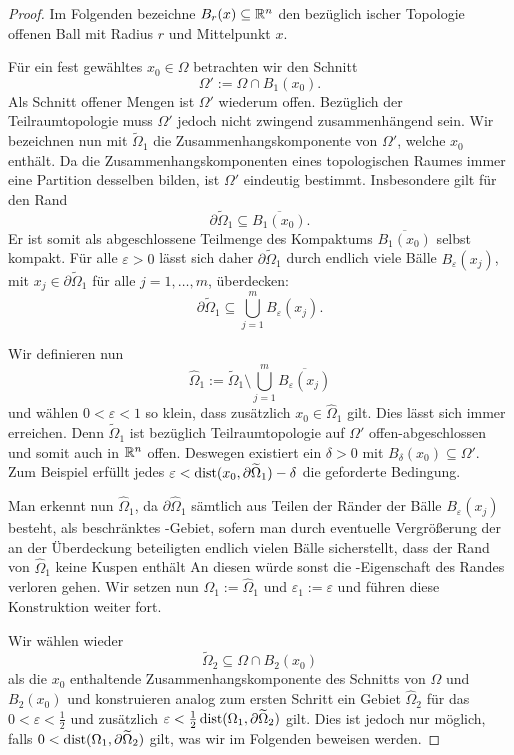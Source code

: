 \begin{proof}
Im Folgenden bezeichne $B_r(x) \subseteq \mathbb{R}^n$ den bezüglich \euklid ischer Topologie offenen Ball mit Radius $r$ und Mittelpunkt $x$.

  Für ein fest gewähltes $x_0 \in \Omega$ betrachten wir den Schnitt 
  $$
  \Omega' := \Omega \cap B_1(x_0).
  $$ 
  Als Schnitt offener Mengen ist $\Omega'$ wiederum offen. 
  Bezüglich der Teilraumtopologie muss $\Omega'$ jedoch nicht zwingend zusammenhängend sein.
  Wir bezeichnen nun mit $\widetilde\Omega_1$ die Zusammenhangskomponente von $\Omega'$, welche $x_0$ enthält.
  Da die Zusammenhangskomponenten eines topologischen Raumes immer eine Partition desselben bilden, ist $\Omega'$ eindeutig bestimmt.
  Insbesondere gilt für den Rand
  $$ 
  \partial \widetilde\Omega_1 \subseteq \overline{B_1(x_0)}.
  $$
  Er ist somit als abgeschlossene Teilmenge des Kompaktums $\overline{B_1(x_0)}$ selbst kompakt.
  Für alle $\varepsilon > 0$ lässt sich daher $\partial \widetilde\Omega_1$ durch endlich viele Bälle $B_\varepsilon(x_j)$, mit $x_j \in \partial \widetilde\Omega_1$ für alle $j = 1,\dots,m$, überdecken:
  $$ 
  \partial \widetilde\Omega_1 \subseteq \bigcup_{j = 1}^m B_\varepsilon(x_j).
  $$

  Wir definieren nun 
  $$
  \widehat\Omega_1 := \widetilde\Omega_1 \setminus \bigcup_{j = 1}^m \overline{B_\varepsilon(x_j)}
  $$
  und wählen $0 < \varepsilon < 1$ so klein, dass zusätzlich $x_0 \in \widehat\Omega_1$ gilt. 
  Dies lässt sich immer erreichen. 
  Denn $\widetilde\Omega_1$ ist bezüglich Teilraumtopologie auf $\Omega'$ offen-abgeschlossen und somit auch in $\mathbb{R}^n$ offen.
  Deswegen existiert ein $\delta > 0$ mit $B_\delta(x_0) \subseteq \Omega'$.
  Zum Beispiel erfüllt jedes $\varepsilon < \operatorname{dist}(x_0, \partial\widetilde\Omega_1) - \delta$ die geforderte Bedingung.

  Man erkennt nun $\widehat\Omega_1$, da $\partial\widehat\Omega_1$ sämtlich aus Teilen der Ränder der Bälle $B_\varepsilon(x_j)$ besteht, als beschränktes \lipschitz\hyp{}Gebiet, sofern man durch eventuelle Vergrößerung der an der Überdeckung beteiligten endlich vielen Bälle sicherstellt, dass der Rand von $\widehat\Omega_1$ keine Kuspen enthält
  An diesen würde sonst die \lipschitz\hyp{}Eigenschaft des Randes verloren gehen.
  Wir setzen nun $\Omega_1 := \widehat\Omega_1$ und $\varepsilon_1 := \varepsilon$ und führen diese Konstruktion weiter fort.

  Wir wählen wieder 
  $$
  \widetilde\Omega_2 \subseteq \Omega \cap B_2(x_0)
  $$
  als die $x_0$ enthaltende Zusammenhangskomponente des Schnitts von $\Omega$ und $B_2(x_0)$ und konstruieren analog zum ersten Schritt ein Gebiet $\widehat\Omega_2$ für das $0 < \varepsilon < \tfrac{1}{2}$ und zusätzlich $\varepsilon < \tfrac{1}{2}\operatorname{dist}(\Omega_1, \partial\widetilde\Omega_2)$ gilt.
  Dies ist jedoch nur möglich, falls $0 < \operatorname{dist}(\Omega_1, \partial\widetilde\Omega_2)$ gilt, was wir im Folgenden beweisen werden.


\end{proof}
